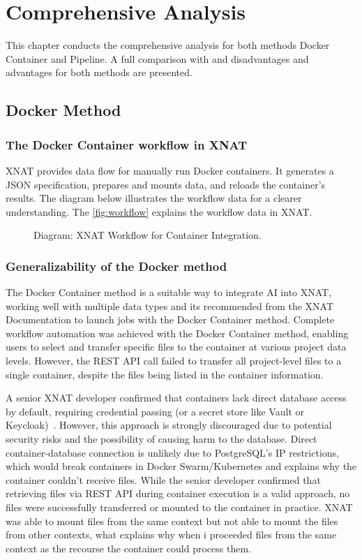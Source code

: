 \chapter{Comprehensive Analysis}
This chapter conducts the comprehensive analysis for both methods Docker Container and Pipeline. 
A full comparison with and disadvantages and advantages for both methods are presented.
\section{Docker Method}
\subsection{The Docker Container workflow in XNAT}

XNAT provides data flow for manually run Docker containers. It generates a JSON specification, prepares and mounts data, and reloads the container's results.
The diagram below illustrates the workflow data for a clearer understanding.  
The \autoref{fig:workflow} explains the workflow data in XNAT.

\begin{figure}[H]
    \centering
    \def\svgwidth{\linewidth} 
    
    \caption{Diagram: XNAT Workflow for Container Integration.}
    \label{fig:workflow}
\end{figure}

\subsection{Generalizability of the Docker method}
The Docker Container method is a suitable way to integrate AI into XNAT, working well with multiple data types and its recommended from the XNAT Documentation to launch jobs with the Docker Container method. Complete workflow automation was achieved with the Docker Container method, enabling users to select and transfer specific files to the container at various project data levels. However, the REST API call failed to transfer all project-level files to a single container, despite the files being listed in the container information.  

A senior XNAT developer confirmed that containers lack direct database access by default, requiring credential passing (or a secret store like Vault or Keycloak)~\cite{database}. However, this approach is strongly discouraged due to potential security risks and the possibility of causing harm to the database. Direct container-database connection is unlikely due to PostgreSQL's IP restrictions, which would break containers in Docker Swarm/Kubernetes and explains why the container couldn't receive files.
While the senior developer confirmed that retrieving files via REST API during container execution is a valid approach, no files were successfully transferred or mounted to the container in practice. 
XNAT was able to mount files from the same context but not able to mount the files from other contexts, what explains why when i proceeded files from the same context as the recourse the container could process them. 




